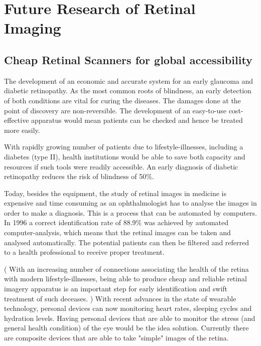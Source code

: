 
\chapter{Future Research of Retinal Imaging}

\label{future_research}


\section{Cheap Retinal Scanners for global accessibility}

The development of an economic and accurate system for an early
glaucoma and diabetic retinopathy. As the most common roots of
blindness, an early detection of both conditions are vital for
curing the diseases. The damages done at the point of discovery
are non-reversible. The development of an easy-to-use cost-effective
apparatus would mean patients can be checked and hence be treated
more easily.

With rapidly growing number of patients due to lifestyle-illnesses,
including a diabetes (type II), health institutions would be able
to save both capacity and resources if such tools were readily
accessible. An early diagnosis of diabetic retinopathy reduces
the risk of blindness of 50\%.\cite{}

Today, besides the equipment, the study of retinal images in medicine
is expensive and time consuming as an ophthalmologist has to analyse
the images in order to make a diagnosis. This is a process that can
be automated by computers.  In 1996 a correct identification rate of
88.9\%
was achieved by automated computer-analysis, which means that the
retinal images can be taken and analysed automatically. The potential
patients can then be filtered and referred to a health professional
to receive proper treatment.\cite{}

( With an increasing number of connections associating the health
of the retina with modern lifestyle-illnesses, being able to produce
cheap and reliable retinal imagery apparatus is an important step for
early identification and swift treatment of such deceases. ) With
recent advances in the state of wearable technology, personal devices
can now monitoring heart rates, sleeping cycles and hydration levels.
Having personal devices that are able to monitor the stress (and
general health condition) of the eye would be the idea solution.
Currently there are composite devices that are able to take "simple"
images of the retina\cite{}.
 
